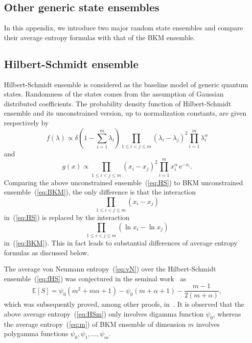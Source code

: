 \documentclass[pdflatex,sn-mathphys-num]{sn-jnl}%
\theoremstyle{thmstyleone}
\newcommand{\ee}{\,\mathrm{e}}
\begin{document}
\begin{appendices}
\section{Other generic state ensembles}\label{appst}
In this appendix, we introduce two major random state ensembles and compare their average entropy formulas with that of the BKM ensemble.

\subsection{Hilbert-Schmidt ensemble}
Hilbert-Schmidt ensemble is considered as the baseline model of generic quantum states. Randomness of the states comes from the assumption of Gaussian distributed coefficients. The probability density function of Hilbert-Schmidt ensemble and its unconstrained version, up to normalization constants, are given respectively by~\cite{Page93}
\begin{equation}\label{eq:fHS}
f(\lambda)\propto\delta\left(1-\sum_{i=1}^{m}\lambda_{i}\right)\prod_{1\leq i<j\leq m}\left(\lambda_{i}-\lambda_{j}\right)^{2}\prod_{i=1}^{m}\lambda_{i}^{\alpha}
\end{equation}
and
\begin{equation}\label{eq:HS}
g(x)\propto\prod_{1\leq i<j\leq m}\left(x_{i}-x_{j}\right)^{2}\prod_{i=1}^{m}x_{i}^{\alpha}\ee^{-x_{i}}.
\end{equation}
Comparing the above unconstrained ensemble~(\ref{eq:HS}) to BKM unconstrained ensemble~(\ref{eq:BKM}), the only difference is that the interaction
\begin{equation}
\prod_{1\leq i<j\leq m}\left(x_{i}-x_{j}\right)
\end{equation}
in~(\ref{eq:HS}) is replaced by the interaction 
\begin{equation}
\prod_{1\leq i<j\leq m}\left(\ln x_{i}-\ln x_{j}\right)
\end{equation}
in~(\ref{eq:BKM}). This in fact leads to substantial differences of average entropy formulas as discussed below.

The average von Neumann entropy~(\ref{eq:vN}) over the Hilbert-Schmidt ensemble~(\ref{eq:fHS}) was conjectured in the seminal work~\cite{Page93} as
\begin{equation}\label{eq:HSm}
\mathbb{E}\!\left[S\right]=\psi_{0}\left(m^{2}+m\alpha+1\right)-\psi_{0}\left(m+\alpha+1\right)-\frac{m-1}{2(m+\alpha)},
\end{equation}
which was subsequently proved, among other proofs, in~\cite{Foong94,Ruiz95}. It is observed that the above average entropy~(\ref{eq:HSm}) only involves digamma function $\psi_{0}$, whereas the average entropy~(\ref{eq:m}) of BKM ensemble of dimension $m$ involves polygamma functions $\psi_{0},\psi_{1},\dots,\psi_{m}$.


\end{appendices}
\end{document}
